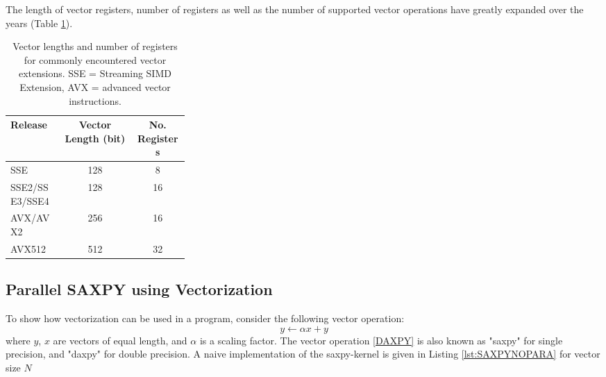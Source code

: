 The length of vector registers, number of registers as well as the number of supported vector operations have greatly expanded over the years (Table \ref{VECTORHARDWARE}).

\begin{table}
\centering
\begin{tabular}{p{0.3\linewidth}cc}
\hline
Release & Vector Length (bit) & No. Registers \\ \hline
SSE & 128 & 8 \\ 
SSE2/SSE3/SSE4 & 128 & 16  \\
AVX/AVX2 & 256 & 16 \\
AVX512 & 512 & 32 \\ 
\hline 
\end{tabular}
\caption{Vector lengths and number of registers for commonly encountered vector extensions. SSE = Streaming SIMD Extension, AVX = advanced vector instructions.}
\label{VECTORHARDWARE}
\end{table}

\subsection{Parallel SAXPY using Vectorization}

To show how vectorization can be used in a program, consider the following vector operation:
\begin{equation}
y \leftarrow \alpha x + y
\label{DAXPY}
\end{equation}
\noindent where $y$, $x$ are vectors of equal length, and $\alpha$ is a scaling factor. The vector operation \ref{DAXPY} is also known as "saxpy" for single precision, and "daxpy" for double precision. A naive implementation of the saxpy-kernel is given in Listing \ref{lst:SAXPYNOPARA} for vector size $N$  


